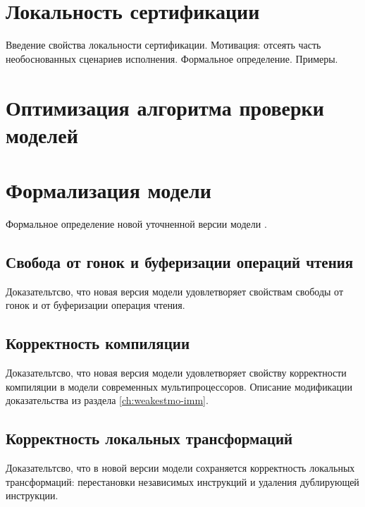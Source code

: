 \section{Локальность сертификации}
\label{sec:cert-loc}

Введение свойства локальности сертификации.
Мотивация: отсеять часть необоснованных сценариев исполнения.
Формальное определение. Примеры. 

\section{Оптимизация алгоритма проверки моделей}
\label{sec:mc-opt}


\section{Формализация модели \WkmS}
\label{sec:wkmo2}

Формальное определение новой уточненной версии модели \WkmS.

\subsection{Свобода от гонок и буферизации операций чтения}

Доказательтсво, что новая версия модели
удовлетворяет свойствам свободы от гонок и от буферизации операция чтения.

\subsection{Корректность компиляции}

Доказательтсво, что новая версия модели
удовлетворяет свойству корректности компиляции в модели
современных мультипроцессоров.
Описание модификации доказательства из раздела \ref{ch:weakestmo-imm}.

\subsection{Корректность локальных трансформаций}

Доказательтсво, что в новой версии модели
сохраняется корректность локальных трансформаций:
перестановки независимых инструкций и удаления дублирующей инструкции. 

